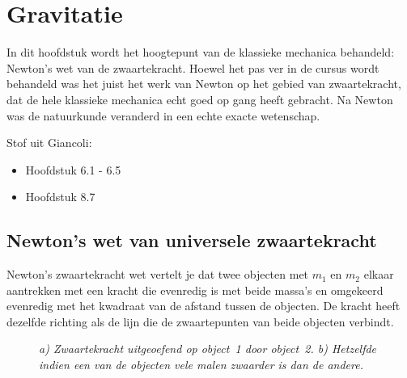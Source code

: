 

\chapter{Gravitatie}

In dit  hoofdstuk wordt het hoogtepunt van de klassieke mechanica behandeld: Newton's
wet van de zwaartekracht. Hoewel het pas ver in de cursus wordt behandeld was het juist
het werk van Newton op het gebied van zwaartekracht, dat de hele klassieke mechanica
echt goed op gang heeft gebracht. Na Newton was de natuurkunde veranderd in een echte
exacte wetenschap.

Stof uit Giancoli:
\begin{itemize}
\item Hoofdstuk 6.1 - 6.5
\item Hoofdstuk 8.7
\end{itemize}

\section{Newton's wet van universele zwaartekracht}

Newton's zwaartekracht wet vertelt je dat twee objecten met $m_1$ en $m_2$ elkaar aantrekken
met een kracht  die evenredig is met beide massa's en omgekeerd evenredig met het kwadraat
van de afstand tussen de objecten. De kracht heeft dezelfde richting als de lijn die de zwaartepunten
van beide objecten verbindt. 

 \begin{figure}[htbp]
\begin{center}
\caption{{\it a) Zwaartekracht uitgeoefend op object~1 door object~2. b) Hetzelfde indien een van de objecten vele malen
zwaarder is dan de andere.}}
\label{fig:NewtonZwaartekracht}
\end{center}
\end{figure} 


